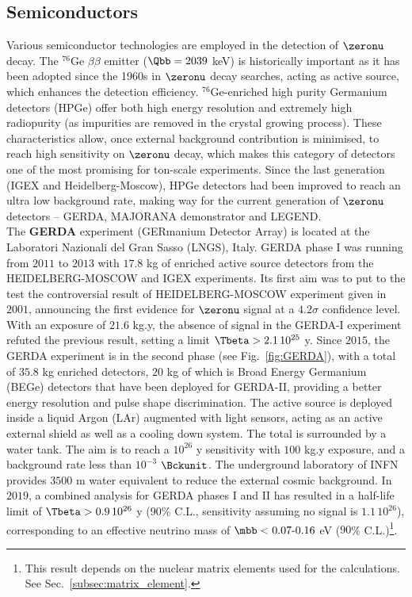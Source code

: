 \subsection{Semiconductors}
\label{subsec:semiconductors}
Various semiconductor technologies are employed in the detection of $\zeronu$ decay.
The $^{76}$Ge $\beta\beta$ emitter ($\Qbb=2039$ keV) is historically important as it has been adopted since the 1960s in $\zeronu$ decay searches, acting as active source, which enhances the detection efficiency.
$^{76}$Ge-enriched high purity Germanium detectors (HPGe) offer both high energy resolution and extremely high radiopurity (as impurities are removed in the crystal growing process).
These characteristics allow, once external background contribution is minimised, to reach high sensitivity on $\zeronu$ decay, which makes this category of detectors one of the most promising for ton-scale experiments.
Since the last generation (IGEX and Heidelberg-Moscow), HPGe detectors had been improved to reach an ultra low background rate, making way for the current generation of $\zeronu$ detectors -- GERDA, MAJORANA demonstrator and LEGEND.\\

The \textbf{GERDA} experiment (GERmanium Detector Array) is located at the Laboratori Nazionali del Gran Sasso (LNGS), Italy.
GERDA phase I was running from $2011$ to $2013$ with $17.8$ kg of enriched active source detectors from the HEIDELBERG-MOSCOW and IGEX experiments.
Its first aim was to put to the test the controversial result of HEIDELBERG-MOSCOW experiment given in $2001$, announcing the first evidence for $\zeronu$ signal at a $4.2\sigma$ confidence level.
With an exposure of $21.6$ kg.y, the absence of signal in the GERDA-I experiment refuted the previous result, setting a limit $\Tbeta>2.1\, 10^{25}$ y.
Since $2015$, the GERDA experiment is in the second phase (see Fig.~\ref{fig:GERDA}), with a total of $35.8$ kg enriched detectors, $20$ kg of which is Broad Energy Germanium (BEGe) detectors that have been deployed for GERDA-II, providing a better energy resolution and pulse shape discrimination.
The active source is deployed inside a liquid Argon (LAr) augmented with light sensors, acting as an active external shield as well as a cooling down system.
The total is surrounded by a water tank.
The aim is to reach a $10^{26}$ y sensitivity with $100$ kg.y exposure, and a background rate less than $10^{-3}$ $\Bckunit$.
The underground laboratory of INFN provides $3500$ m water equivalent to reduce the external cosmic background.
In $2019$, a combined analysis for GERDA phases I and II has resulted in a half-life limit of $\Tbeta>0.9\, 10^{26}$ y ($90$\% C.L., sensitivity assuming no signal is $1.1\, 10^{26}$), corresponding to an effective neutrino mass of $\mbb<0.07\text{-}0.16$ eV ($90$\% C.L.)\footnote{This result depends on the nuclear matrix elements used for the calculations. See Sec.~\ref{subsec:matrix_element}.}.



